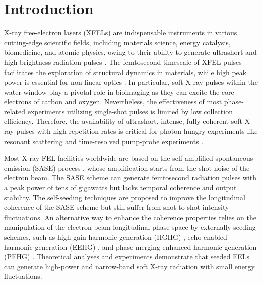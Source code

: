 \documentclass[%
 reprint,
 amsmath,amssymb,
 aps,
]{revtex4-2}
\begin{document}
\maketitle


\section{\label{sec:1}Introduction}
X-ray free-electron lasers (XFELs) are indispensable instruments in various cutting-edge scientific fields, including materials science, energy catalysis, biomedicine, and atomic physics, owing to their ability to generate ultrashort and high-brightness radiation pulses \citep{Huang2021}. The femtosecond timescale of XFEL pulses facilitates the exploration of structural dynamics in materials, while high peak power is essential for non-linear optics \citep{Schreck2015}. In particular, soft X-ray pulses within the water window play a pivotal role in bioimaging as they can excite the core electrons of carbon and oxygen. Nevertheless, the effectiveness of most phase-related experiments utilizing single-shot pulses is limited by low collection efficiency. Therefore, the availability of ultrashort, intense, fully coherent soft X-ray pulses with high repetition rates is critical for photon-hungry experiments like resonant scattering and time-resolved pump-probe experiments \citep{Schaper2021}.

Most X-ray FEL facilities worldwide are based on the self-amplified spontaneous emission (SASE) process \citep{Kondratenko1980}, whose amplification starts from the shot noise of the electron beam. The SASE scheme can generate femtosecond radiation pulses with a peak power of tens of gigawatts but lacks temporal coherence and output stability. The self-seeding techniques \citep{Gianluca2011} are proposed to improve the longitudinal coherence of the SASE scheme but still suffer from shot-to-shot intensity fluctuations. An alternative way to enhance the coherence properties relies on the manipulation of the electron beam longitudinal phase space by externally seeding schemes, such as high-gain harmonic generation (HGHG) \citep{Yu1991}, echo-enabled harmonic generation (EEHG) \citep{Stupakov2009}, and phase-merging enhanced harmonic generation (PEHG) \citep{Deng2013}. Theoretical analyses and experiments demonstrate that seeded FELs can generate high-power and narrow-band soft X-ray radiation with small energy fluctuations.
\end{document}
